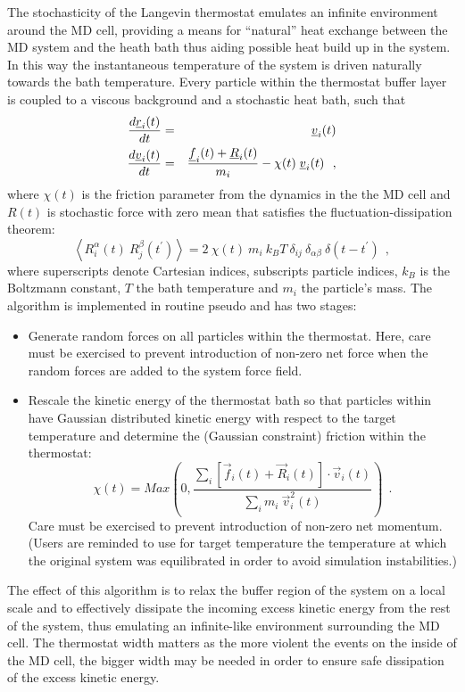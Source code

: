 \begin{enumerate}
\begin{itemize}
The stochasticity of the Langevin thermostat emulates an infinite
environment around the MD cell, providing a means for ``natural''
heat exchange between the MD system and the heath bath thus aiding
possible heat build up in the system.  In this way the instantaneous
temperature of the system is driven naturally towards the bath
temperature.  Every particle within the thermostat buffer layer is
coupled to a viscous background and a stochastic heat bath, such
that
\begin{eqnarray}
{d \mbox{$\underline{r}$}_{i}(t) \over d t} &=& \mbox{$\underline{v}$}_{i}(t) \nonumber \\
{d \mbox{$\underline{v}$}_{i}(t) \over d t} &=& {{\mbox{$\underline{f}$}_{i}(t)+\mbox{$\underline{R}$}_{i}(t)}
\over m_{i}} - \chi (t) \; \mbox{$\underline{v}$}_{i}(t)~~,
\end{eqnarray}
where $\chi (t)$ is the friction parameter from the dynamics in the
the MD cell and $R(t)$ is stochastic force with zero mean that
satisfies the fluctuation-dissipation theorem:
\begin{equation}
\left< R^{\alpha}_{i}(t)~R^{\beta}_{j}(t^\prime) \right> =
2~\chi(t)~m_{i}~k_{B}T~\delta_{ij}~\delta_{\alpha
\beta}~\delta(t-t^\prime)~~,
\end{equation}
where superscripts denote Cartesian indices, subscripts particle
indices, $k_{B}$ is the Boltzmann constant, $T$ the bath
temperature and $m_{i}$ the particle's mass.  The algorithm is
implemented in routine {\sc pseudo} and has two stages:
\begin{itemize}
\item Generate random forces on all particles within
the thermostat.  Here, care must be exercised to prevent
introduction of non-zero net force when the random forces are added
to the system force field.
\item Rescale the kinetic energy of the thermostat bath so that
particles within have Gaussian distributed kinetic energy with
respect to the target temperature and determine the (Gaussian
constraint) friction within the thermostat:
\begin{equation}
\chi(t) = Max \left( 0, \frac
{\sum_{i} [\vec{f}_{i}(t) + \vec{R}_{i}(t)] \cdot \vec{v}_{i}(t)}
{\sum_{i} m_{i}~\vec{v}_{i}^{2}(t)} \right)~~.
\end{equation}
Care must be exercised to prevent introduction of non-zero net
momentum.  (Users are reminded to use for target temperature the
temperature at which the original system was equilibrated in order
to avoid simulation instabilities.)
\end{itemize}
The effect of this algorithm is to relax the buffer region of the
system on a local scale and to effectively dissipate the incoming
excess kinetic energy from the rest of the system, thus emulating an
infinite-like environment surrounding the MD cell.  The thermostat
width matters as the more violent the events on the inside of the MD
cell, the bigger width may be needed in order to ensure safe
dissipation of the excess kinetic energy.


\end{itemize}
\end{enumerate}
